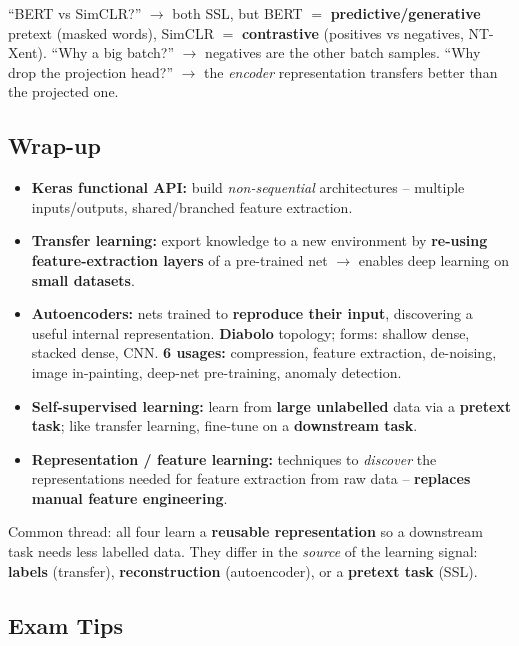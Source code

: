 \documentclass[10pt,a4paper]{article}
\begin{document}
	\begin{examtipbox}
		``BERT vs SimCLR?'' $\to$ both SSL, but BERT $=$ \textbf{predictive/generative} pretext (masked words), SimCLR $=$ \textbf{contrastive} (positives vs negatives, NT-Xent). ``Why a big batch?'' $\to$ negatives are the other batch samples. ``Why drop the projection head?'' $\to$ the \emph{encoder} representation transfers better than the projected one.
	\end{examtipbox}

	\subsection{Wrap-up}

	\begin{itemize}[leftmargin=*]
		\item \textbf{Keras functional API:} build \emph{non-sequential} architectures -- multiple inputs/outputs, shared/branched feature extraction.
		\item \textbf{Transfer learning:} export knowledge to a new environment by \textbf{re-using feature-extraction layers} of a pre-trained net $\to$ enables deep learning on \textbf{small datasets}.
		\item \textbf{Autoencoders:} nets trained to \textbf{reproduce their input}, discovering a useful internal representation. \textbf{Diabolo} topology; forms: shallow dense, stacked dense, CNN. \textbf{6 usages:} compression, feature extraction, de-noising, image in-painting, deep-net pre-training, anomaly detection.
		\item \textbf{Self-supervised learning:} learn from \textbf{large unlabelled} data via a \textbf{pretext task}; like transfer learning, fine-tune on a \textbf{downstream task}.
		\item \textbf{Representation / feature learning:} techniques to \emph{discover} the representations needed for feature extraction from raw data -- \textbf{replaces manual feature engineering}.
	\end{itemize}

	\begin{importantbox}
		Common thread: all four learn a \textbf{reusable representation} so a downstream task needs less labelled data. They differ in the \emph{source} of the learning signal: \textbf{labels} (transfer), \textbf{reconstruction} (autoencoder), or a \textbf{pretext task} (SSL).
	\end{importantbox}

	\subsection{Exam Tips}
\end{document}
